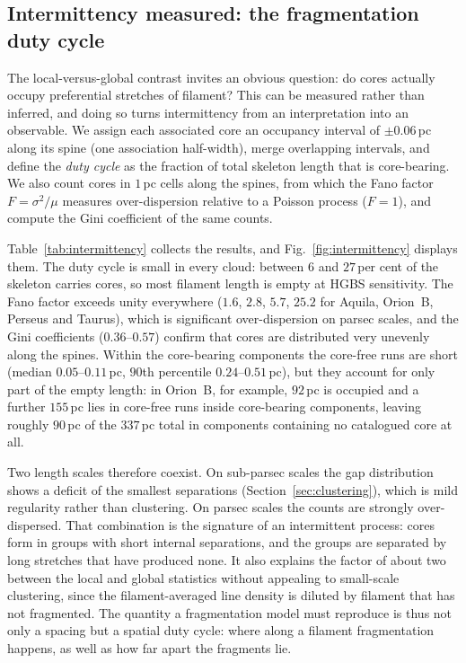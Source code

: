 \documentclass[usenatbib,twoside,twocolumn]{mnras}
\begin{document}
\subsection{Intermittency measured: the fragmentation duty cycle}
\label{sec:intermittency}

The local-versus-global contrast invites an obvious question: do cores actually occupy preferential stretches of filament? This can be measured rather than inferred, and doing so turns intermittency from an interpretation into an observable. We assign each associated core an occupancy interval of $\pm0.06$\,pc along its spine (one association half-width), merge overlapping intervals, and define the \emph{duty cycle} as the fraction of total skeleton length that is core-bearing. We also count cores in $1$\,pc cells along the spines, from which the Fano factor $F=\sigma^2/\mu$ measures over-dispersion relative to a Poisson process ($F=1$), and compute the Gini coefficient of the same counts.

Table~\ref{tab:intermittency} collects the results, and Fig.~\ref{fig:intermittency} displays them. The duty cycle is small in every cloud: between $6$ and $27$\,per cent of the skeleton carries cores, so most filament length is empty at HGBS sensitivity. The Fano factor exceeds unity everywhere ($1.6$, $2.8$, $5.7$, $25.2$ for Aquila, Orion~B, Perseus and Taurus), which is significant over-dispersion on parsec scales, and the Gini coefficients ($0.36$--$0.57$) confirm that cores are distributed very unevenly along the spines. Within the core-bearing components the core-free runs are short (median $0.05$--$0.11$\,pc, $90$th percentile $0.24$--$0.51$\,pc), but they account for only part of the empty length: in Orion~B, for example, $92$\,pc is occupied and a further $155$\,pc lies in core-free runs inside core-bearing components, leaving roughly $90$\,pc of the $337$\,pc total in components containing no catalogued core at all.

Two length scales therefore coexist. On sub-parsec scales the gap distribution shows a deficit of the smallest separations (Section~\ref{sec:clustering}), which is mild regularity rather than clustering. On parsec scales the counts are strongly over-dispersed. That combination is the signature of an intermittent process: cores form in groups with short internal separations, and the groups are separated by long stretches that have produced none. It also explains the factor of about two between the local and global statistics without appealing to small-scale clustering, since the filament-averaged line density is diluted by filament that has not fragmented. The quantity a fragmentation model must reproduce is thus not only a spacing but a spatial duty cycle: where along a filament fragmentation happens, as well as how far apart the fragments lie.
\end{document}
